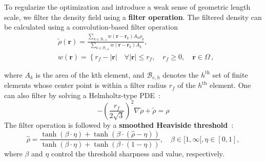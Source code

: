     To regularize the optimization and introduce a weak sense of geometric length
    scale, we filter
    the density field using a \textbf{filter operation}. The filtered density can
    be calculated using a
    convolution-based filter operation~\cite{projection}
    \begin{equation}
        \begin{aligned}
             & \tilde{\rho}(\mathbf{r})=\frac{\sum_{k \in \mathcal{B}_{e, h}}
                w\left(\mathbf{r}-\mathbf{r}_k\right) A_k \rho_k}{\sum_{k \in \mathcal{B}_{e,
            h}} w\left(\mathbf{r}-\mathbf{r}_k\right) A_k},                              \\
             & w(\mathbf{r})=\left\{r_f-|\mathbf{r}| \quad \forall|\mathbf{r}| \leq r_f,
            \quad r_f \geq 0, \quad \mathbf{r} \in \Omega\right.\,,
        \end{aligned}
    \end{equation}

    where $A_k$ is the area of the kth element, and $\mathcal{B}_{e, h}$ denotes
    the
$h^\text{th}$ set of finite elements whose center point is within a filter
    radius $r_f$ of the
$h^\text{th}$ element. One can also filter by solving a Helmholtz-type
    PDE~\cite{PDE_filter}:
    \begin{equation}
        -\left(\frac{r_f}{2 \sqrt{3}}\right)^2 \nabla
        \tilde{\rho}+\tilde{\rho}=\rho
    \end{equation}
    The filter operation is followed by a \textbf{smoothed Heaviside
        threshold}~\cite{projection}:
    \begin{equation}
        \hat{\rho}=\frac{\tanh (\beta \cdot \eta)+\tanh (\beta
            \cdot(\hat{\rho}-\eta))}{\tanh (\beta \cdot \eta)+\tanh (\beta \cdot(1-\eta))},
        \quad \beta \in[1, \infty[, \eta \in[0,1],
    \end{equation}
    where $\beta$ and $\eta$ control the threshold sharpness and value,
    respectively.

